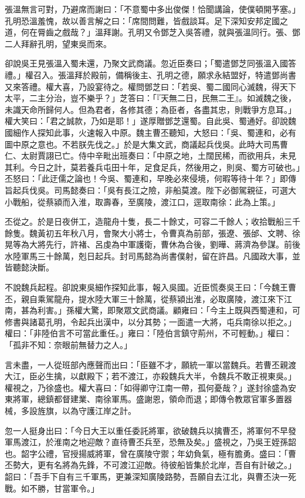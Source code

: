 張溫無言可對，乃避席而謝曰：「不意蜀中多出俊傑！恰聞講論，使僕頓開芧塞。」孔明恐溫羞愧，故以善言解之曰：「席間問難，皆戲談耳。足下深知安邦定國之道，何在脣齒之戲哉？」溫拜謝。孔明又令鄧芝入吳答禮，就與張溫同行。張、鄧二人拜辭孔明，望東吳而來。

卻說吳王見張溫入蜀未還，乃聚文武商議。忽近臣奏曰；「蜀遣鄧芝同張溫入國答禮。」權召入。張溫拜於殿前，備稱後主、孔明之德，願求永結盟好，特遣鄧尚書又來答禮。權大喜，乃設宴待之。權問鄧芝曰：「若吳、蜀二國同心滅魏，得天下太平，二主分治，豈不樂乎？」芝答曰：「『天無二日，民無二王』。如滅魏之後，未識天命所歸何人。但為君者，各修其德；為臣者，各盡其忠，則戰爭方息耳。」權大笑曰：「君之誠款，乃如是耶！」遂厚贈鄧芝還蜀。自此吳、蜀通好。卻說魏國細作人探知此事，火速報入中原。魏主曹丕聽知，大怒曰：「吳、蜀連和，必有圖中原之意也。不若朕先伐之。」於是大集文武，商議起兵伐吳。此時大司馬曹仁、太尉賈詡已亡。侍中辛毗出班奏曰：「中原之地，土闊民稀，而欲用兵，未見其利。今日之計，莫若養兵屯田十年，足食足兵，然後用之，則吳、蜀方可破也。」丕怒曰：「此迂儒之論也！今吳、蜀連和，早晚必來侵境，何暇等待十年？」即傳旨起兵伐吳。司馬懿奏曰：「吳有長江之險，非船莫渡。陛下必御駕親征，可選大小戰船，從蔡潁而入淮，取壽春，至廣陵，渡江口，逕取南徐：此為上策。」

丕從之。於是日夜併工，造龍舟十隻，長二十餘丈，可容二千餘人；收拾戰船三千餘隻。魏黃初五年秋八月，會聚大小將士，令曹真為前部，張遼、張邰、文聘、徐晃等為大將先行，許褚、呂虔為中軍護衛，曹休為合後，劉曄、蔣濟為參謀。前後水陸軍馬三十餘萬，剋日起兵。封司馬懿為尚書僕射，留在許昌。凡國政大事，並皆聽懿決斷。

不說魏兵起程。卻說東吳細作探知此事，報入吳國。近臣慌奏吳王曰：「今魏王曹丕，親自乘駕龍舟，提水陸大軍三十餘萬，從蔡潁出淮，必取廣陵，渡江來下江南，甚為利害。」孫權大驚，即聚眾文武商議。顧雍曰：「今主上既與西蜀連和，可修書與諸葛孔明，令起兵出漢中，以分其勢；一面遣一大將，屯兵南徐以拒之。」權曰：「非陸伯言不可當此重任。」雍曰：「陸伯言鎮守荊州，不可輕動。」權曰：「孤非不知：奈眼前無替力之人。」

言未盡，一人從班部內應聲而出曰：「臣雖不才，願統一軍以當魏兵。若曹丕親渡大江，臣必生擒，以獻殿下；若不渡江，亦殺魏兵大半，令魏兵不敢正視東吳。」權視之，乃徐盛也。權大喜曰：「如得卿守江南一帶，孤何憂哉？」遂封徐盛為安東將軍，總鎮都督建業、南徐軍馬。盛謝恩，領命而退；即傳令教眾官軍多置器械，多設旌旗，以為守護江岸之計。

忽一人挺身出曰：「今日大王以重任委託將軍，欲破魏兵以擒曹丕，將軍何不早發軍馬渡江，於淮南之地迎敵？直待曹丕兵至，恐無及矣。」盛視之，乃吳王姪孫韶也。韶字公禮，官授揚威將軍，曾在廣陵守禦；年幼負氣，極有膽勇。盛曰：「曹丕勢大，更有名將為先鋒，不可渡江迎敵。待彼船皆集於北岸，吾自有計破之。」韶曰：「吾手下自有三千軍馬，更兼深知廣陵路勢，吾願自去江北，與曹丕決一死戰。如不勝，甘當軍令。」

